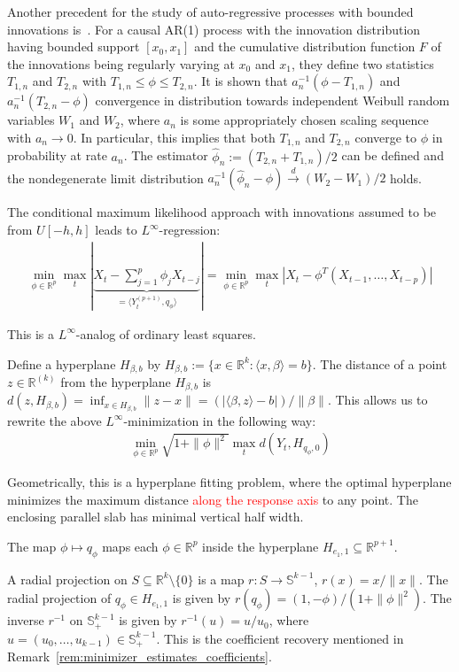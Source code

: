 Another precedent for the study of auto-regressive processes with bounded innovations is~\cite{davis_estimation_1989}. For a causal AR(1) process with the innovation distribution having bounded support $[x_0,x_1]$ and the cumulative distribution function $F$ of the innovations being regularly varying at $x_0$ and $x_1$, they define two statistics $T_{1,n}$ and $T_{2,n}$ with $T_{1,n}\le\phi\le T_{2,n}$. It is shown that $a_n^{-1}(\phi-T_{1,n})$ and $a_n^{-1}(T_{2,n}-\phi)$ convergence in distribution towards independent Weibull random variables $W_1$ and $W_2$, where $a_n$ is some appropriately chosen scaling sequence with $a_n\to0$. In particular, this implies that both $T_{1,n}$ and $T_{2,n}$ converge to $\phi$ in probability at rate $a_n$. The estimator $\hat{\phi}_n:=(T_{2,n}+T_{1,n})/2$ can be defined and the nondegenerate limit distribution $a_n^{-1}(\hat{\phi}_n-\phi)\stackrel{d}{\to}(W_2-W_1)/2$ holds.

The conditional maximum likelihood approach with innovations assumed to be from $U[-h,h]$ leads to $L^{\infty}$-regression:
\begin{align*}
    \min_{\phi\in\mathbb{R}^{p}}\max_{t}\left|\underbrace{X_t-\sum_{j=1}^{p}\phi_jX_{t-j}}_{=\langle Y_t^{(p+1)},q_{\phi}\rangle}\right|=\min_{\phi\in\mathbb{R}^{p}}\max_t|X_t-\phi^{T}(X_{t-1},\dots,X_{t-p})|
\end{align*}

This is a $L^{\infty}$-analog of ordinary least squares.

Define a hyperplane $H_{\beta,b}$ by $H_{\beta,b}:=\{x\in\mathbb{R}^{k}:\langle x,\beta\rangle=b\}$. The distance of a point $z\in\mathbb{R}^{(k)}$ from the hyperplane $H_{\beta,b}$ is $d(z,H_{\beta,b})=\inf_{x\in H_{\beta,b}}\|z-x\|=(|\langle\beta,z\rangle-b|)/\|\beta\|$. This allows us to rewrite the above $L^{\infty}$-minimization in the following way:
\begin{align*}
    \min_{\phi\in\mathbb{R}^{p}}\sqrt{1+\|\phi\|^2}\max_td(Y_t,H_{q_{\phi},0})
\end{align*}

Geometrically, this is a hyperplane fitting problem, where the optimal hyperplane minimizes the maximum distance \textcolor{red}{along the response axis} to any point. The enclosing parallel slab has minimal vertical half width.

The map $\phi\mapsto q_{\phi}$ maps each $\phi\in\mathbb{R}^{p}$ inside the hyperplane $H_{e_1,1}\subseteq\mathbb{R}^{p+1}$.

A radial projection on $S\subseteq\mathbb{R}^{k}\setminus\{0\}$ is a map $r:S\to\mathbb{S}^{k-1}$, $r(x)=x/\|x\|$. The radial projection of $q_{\phi}\in H_{e_1,1}$ is given by $r(q_{\phi})=(1,-\phi)/(1+\|\phi\|^2)$. The inverse $r^{-1}$ on $\mathbb{S}^{k-1}_{+}$ is given by $r^{-1}(u)=u/u_0$, where $u=(u_0,\dots,u_{k-1})\in\mathbb{S}^{k-1}_{+}$. This is the coefficient recovery mentioned in Remark~\ref{rem:minimizer_estimates_coefficients}.

